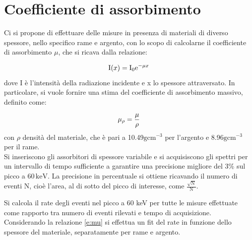 \documentclass[twocolumn,10pt]{asme2ej}
\begin{document}
\section{Coefficiente di assorbimento}\label{s:attenuazione} 

Ci si propone di effettuare delle misure in presenza di materiali di diverso spessore, nello specifico rame e argento,
con lo scopo di calcolarne il coefficiente di assorbimento $\mu$, che si ricava dalla relazione:

\vspace{-15pt}
\begin{equation}
   \text{I}(x) = \text{I}_0 \text{e}^{-\mu x}
    \vspace{-5pt}
    \label{e:mu}
\end{equation}
dove I è l'intensità della radiazione incidente e x lo spessore attraversato. In particolare, si vuole fornire una stima
del coefficiente di assorbimento massivo, definito come:

\vspace{-15pt}
\begin{equation}
   \mu_{\rho} = \frac{\mu}{\rho}
    \vspace{-5pt}
    \label{e:mu_mass}
\end{equation}
con $\rho$ densità del materiale, che è pari a 10.49$\si{\gram \centi\metre ^{-3}}$ per l'argento
e 8.96$\si{\gram \centi\metre ^{-3}}$ per il rame. 
\\ Si inseriscono gli assorbitori di spessore variabile e si acquisiscono gli spettri per
un intervallo di tempo sufficiente a garantire una precisione migliore del 3\% sul picco a $60\,\si{\kilo\electronvolt}$.
La precisione in percentuale si ottiene ricavando il numero di eventi N, cioè l'area, al di sotto del
picco di interesse, come $\frac{\sqrt{\text{N}}}{\text{N}}$. 

Si calcola il rate degli eventi nel picco a 60 keV per tutte le misure effettuate come rapporto tra numero di 
eventi rilevati e tempo di acquisizione. Considerando la relazione \autoref{e:mu} si effettua un fit del 
rate in funzione dello spessore del materiale, separatamente per rame e argento. 
\end{document}

